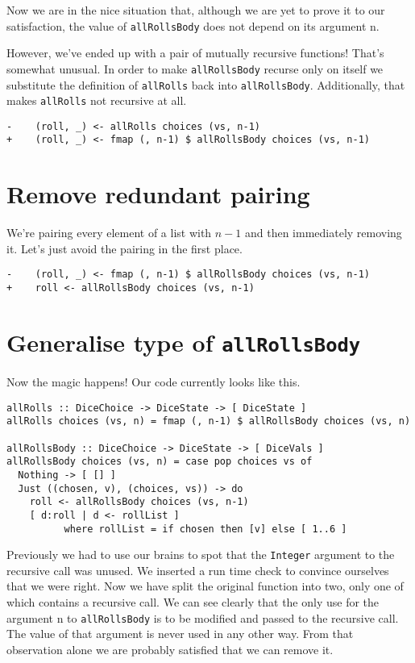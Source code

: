 Now we are in the nice situation that, although we are yet to prove it to our satisfaction, the value of \texttt{allRollsBody} does not depend on its argument n.

However, we've ended up with a pair of mutually recursive functions! That's somewhat unusual. In order to make \texttt{allRollsBody} recurse only on itself we substitute the definition of \texttt{allRolls} back into \texttt{allRollsBody}. Additionally, that makes \texttt{allRolls} not recursive at all.

\begin{verbatim}
-    (roll, _) <- allRolls choices (vs, n-1)
+    (roll, _) <- fmap (, n-1) $ allRollsBody choices (vs, n-1)
\end{verbatim}


\section{Remove redundant pairing}


We're pairing every element of a list with $n-1$ and then immediately removing it. Let's just avoid the pairing in the first place.

\begin{verbatim}
-    (roll, _) <- fmap (, n-1) $ allRollsBody choices (vs, n-1)
+    roll <- allRollsBody choices (vs, n-1)
\end{verbatim}


\section{Generalise type of \texttt{allRollsBody}}


Now the magic happens! Our code currently looks like this.

\begin{verbatim}
allRolls :: DiceChoice -> DiceState -> [ DiceState ]
allRolls choices (vs, n) = fmap (, n-1) $ allRollsBody choices (vs, n)

allRollsBody :: DiceChoice -> DiceState -> [ DiceVals ]
allRollsBody choices (vs, n) = case pop choices vs of
  Nothing -> [ [] ]
  Just ((chosen, v), (choices, vs)) -> do
    roll <- allRollsBody choices (vs, n-1)
    [ d:roll | d <- rollList ]
          where rollList = if chosen then [v] else [ 1..6 ]
\end{verbatim}
Previously we had to use our brains to spot that the \texttt{Integer} argument to the recursive call was unused. We inserted a run time check to convince ourselves that we were right. Now we have split the original function into two, only one of which contains a recursive call. We can see clearly that the only use for the argument n to \texttt{allRollsBody} is to be modified and passed to the recursive call. The value of that argument is never used in any other way. From that observation alone we are probably satisfied that we can remove it.

